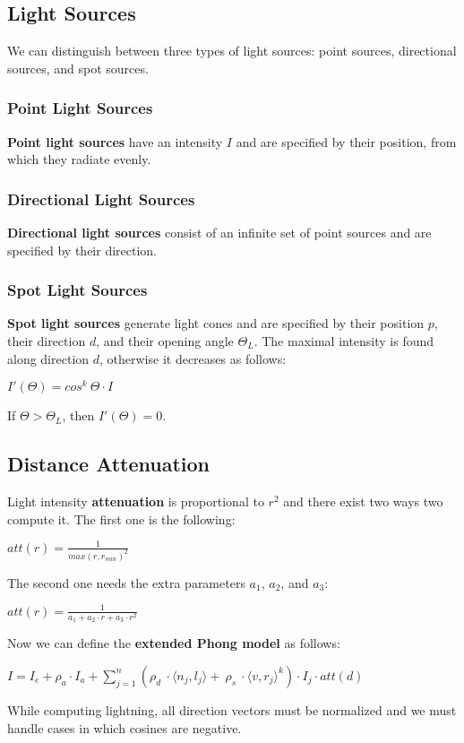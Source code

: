 \documentclass{article}
\begin{document}
\subsection{Light Sources}
We can distinguish between three types of light sources: point sources, directional sources, and spot sources.
\subsubsection{Point Light Sources}
\textbf{Point light sources} have an intensity $I$ and are specified by their position, from which they radiate evenly.
\subsubsection{Directional Light Sources}
\textbf{Directional light sources} consist of an infinite set of point sources and are specified by their direction.
\subsubsection{Spot Light Sources}
\textbf{Spot light sources} generate light cones and are specified by their position $p$, their direction $d$, and their opening angle $\Theta_L$. The maximal intensity is found along direction $d$, otherwise it decreases as follows:
\begin{center}
    $I'(\Theta) = cos^k \ \Theta \cdot I$
\end{center}
If $\Theta > \Theta_L$, then $I'(\Theta) = 0$.
\subsection{Distance Attenuation}
Light intensity \textbf{attenuation} is proportional to $r^2$ and there exist two ways two compute it. The first one is the following:
\begin{center}
    $att(r) = \displaystyle\frac{1}{max(r,r_{min})^2}$
\end{center}
The second one needs the extra parameters $a_1$, $a_2$, and $a_3$:
\begin{center}
    $att(r) = \displaystyle\frac{1}{a_1 + a_2 \cdot r + a_3 \cdot r^2}$
\end{center}
\newpage
\noindent
Now we can define the \textbf{extended Phong model} as follows:
\begin{center}
    $ I = I_e + \rho_a \cdot I_a + \displaystyle\sum^n_{j=1}(\rho_d \ \cdot \langle n_j,l_j\rangle + \ \rho_s \ \cdot \langle v,r_j\rangle^k) \cdot I_j  \cdot att(d)$
\end{center}
While computing lightning, all direction vectors must be normalized and we must handle cases in which cosines are negative.
\end{document}
